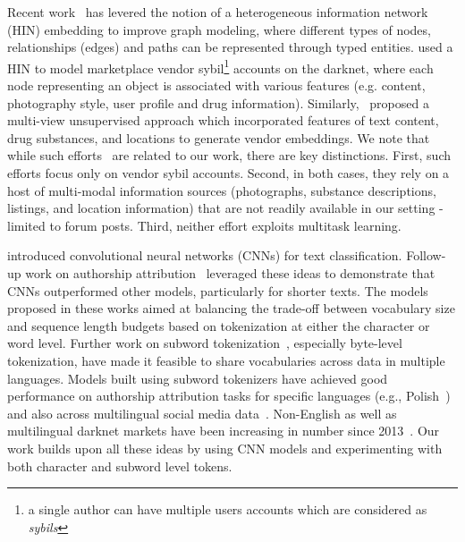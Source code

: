 Recent work~\cite{fan2018automatic,hou2017hindroid,fu2017hin2vec,dong2017metapath2vec} has levered the notion of a heterogeneous information network (HIN) embedding to improve graph modeling, where different types of nodes, relationships (edges) and paths can be represented through typed entities.  
\citet{zhang2019style} used a HIN to model marketplace vendor sybil\footnote{a single author can have multiple users accounts which are considered as \textit{sybils}} accounts on the darknet, where each node representing an object is associated with various features (e.g. content, photography style, user profile and drug information).
Similarly,~\citet{kumar2020edarkfind} proposed a multi-view unsupervised approach which incorporated features of text content, drug substances, and locations to generate vendor embeddings. We note that while such efforts~\cite{zhang2019style,kumar2020edarkfind} are related to our work, there are key distinctions. 
First, such efforts focus only on vendor sybil accounts. 
Second, in both cases, they rely on a host of multi-modal information sources (photographs, substance descriptions, listings, and location information) that are not readily available in our setting -  limited to forum posts.
Third, neither effort exploits multitask learning. 

\citet{kim2014convolutional} introduced convolutional neural networks (CNNs) for text classification.
Follow-up work on authorship attribution~\cite{ruder2016character, shrestha2017convolutional} leveraged these ideas to demonstrate that CNNs outperformed other models, particularly for shorter texts. 
The models proposed in these works aimed at balancing the trade-off between vocabulary size and sequence length budgets based on tokenization at either the character or word level.
Further work on subword tokenization~\cite{sennrich2016neural}, especially byte-level tokenization, have made it feasible to share vocabularies across data in multiple languages. 
Models built using subword tokenizers have achieved good performance on authorship attribution tasks for specific languages (e.g., Polish~\cite{grzybowski2019sparse}) and also across multilingual social media data~\cite{andrews2019learning}.
Non-English as well as multilingual darknet markets have been increasing in number since 2013~\cite{ebrahimi2018detecting}.
Our work builds upon all these ideas by using CNN models and experimenting with both character and subword level tokens.


